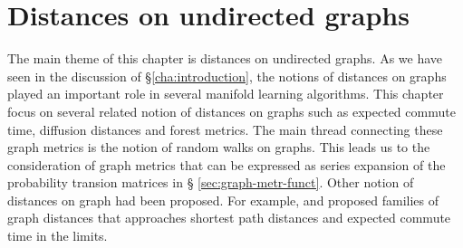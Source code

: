 \chapter{Distances on undirected graphs}
\label{cha:dist-undir-graphs}
The main theme of this chapter is distances on undirected graphs. As
we have seen in the discussion of \S \ref{cha:introduction}, the
notions of distances on graphs played an important role in several
manifold learning algorithms. This chapter focus on several related
notion of distances on graphs such as expected commute time, diffusion
distances and forest metrics. The main thread connecting these graph
metrics is the notion of random walks on graphs. This leads us to
the consideration of graph metrics that can be expressed as series
expansion of the probability transion matrices in \S
\ref{sec:graph-metr-funct}. Other notion of distances on graph had
been proposed. For example, \citet{yen08:_famil_of_dissim_measur_between}
and \citet{chebotarev08:_new_famil_of_graph_distan} proposed families
of graph distances that approaches shortest path distances and
expected commute time in the limits. 
